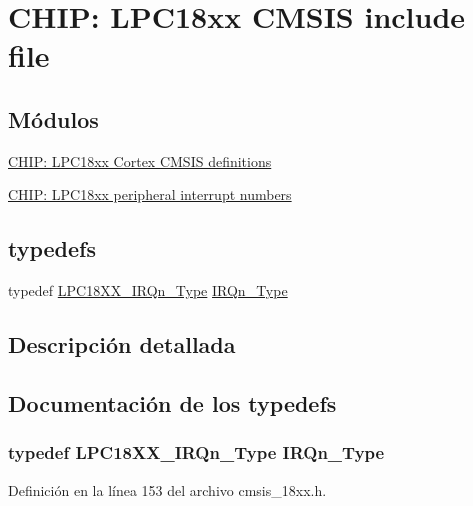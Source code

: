 \hypertarget{group___c_m_s_i_s__18_x_x}{}\section{C\+H\+IP\+: L\+P\+C18xx C\+M\+S\+IS include file}
\label{group___c_m_s_i_s__18_x_x}
\subsection*{Módulos}
\begin{DoxyCompactItemize}
\item 
\hyperlink{group___c_m_s_i_s__18_x_x___c_o_m_m_o_n}{C\+H\+I\+P\+: L\+P\+C18xx Cortex C\+M\+S\+I\+S definitions}
\item 
\hyperlink{group___c_m_s_i_s__18_x_x___i_r_q}{C\+H\+I\+P\+: L\+P\+C18xx peripheral interrupt numbers}
\end{DoxyCompactItemize}
\subsection*{\textquotesingle{}typedefs\textquotesingle{}}
\begin{DoxyCompactItemize}
\item 
typedef \hyperlink{group___c_m_s_i_s__18_x_x___i_r_q_gaa44deabd252bda567898bae35a086adc}{L\+P\+C18\+X\+X\+\_\+\+I\+R\+Qn\+\_\+\+Type} \hyperlink{group___c_m_s_i_s__18_x_x_ga05b7a1270df5ec5a74fa3210e16be1e0}{I\+R\+Qn\+\_\+\+Type}
\end{DoxyCompactItemize}


\subsection{Descripción detallada}


\subsection{Documentación de los \textquotesingle{}typedefs\textquotesingle{}}
\subsubsection[{\texorpdfstring{I\+R\+Qn\+\_\+\+Type}{IRQn_Type}}]{\setlength{\rightskip}{0pt plus 5cm}typedef {\bf L\+P\+C18\+X\+X\+\_\+\+I\+R\+Qn\+\_\+\+Type} {\bf I\+R\+Qn\+\_\+\+Type}}\hypertarget{group___c_m_s_i_s__18_x_x_ga05b7a1270df5ec5a74fa3210e16be1e0}{}\label{group___c_m_s_i_s__18_x_x_ga05b7a1270df5ec5a74fa3210e16be1e0}


Definición en la línea 153 del archivo cmsis\+\_\+18xx.\+h.

